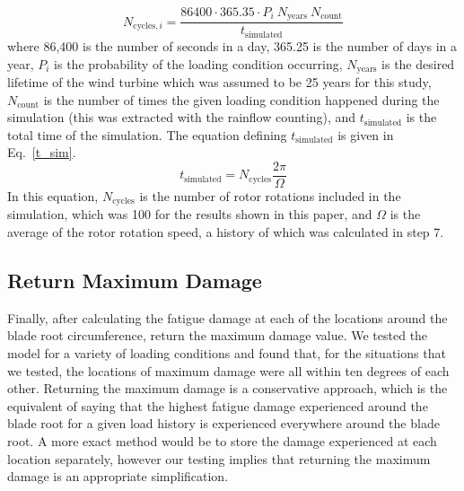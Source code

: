 \documentclass[11pt,letterpaper]{article}
\begin{document}
% 
\begin{equation}
    N_{\text{cycles},i} = \frac{86400 \cdot 365.35 \cdot P_i ~ N_{\text{years}}~ N_{\text{count}}}{t_{\text{simulated}}}
    \label{ncycles}
\end{equation}
% 
where 86,400 is the number of seconds in a day, 365.25 is the number of days in a year, $P_i$ is the probability of the loading condition occurring, $N_{\text{years}}$ is the desired lifetime of the wind turbine which was assumed to be 25 years for this study, $N_{\text{count}}$ is the number of times the given loading condition happened during the simulation (this was extracted with the rainflow counting), and $t_{\text{simulated}}$ is the total time of the simulation. The equation defining $t_{\text{simulated}}$ is given in Eq.~\ref{t_sim}.
% 
\begin{equation}
    t_{\text{simulated}} = N_{\text{cycles}} \frac{2\pi}{\Omega}
    \label{t_sim}
\end{equation}
% 
In this equation, $N_{\text{cycles}}$ is the number of rotor rotations included in the simulation, which was 100 for the results shown in this paper, and $\Omega$ is the average of the rotor rotation speed, a history of which was calculated in step 7. 
                


\subsection{Return Maximum Damage}

Finally, after calculating the fatigue damage at each of the locations around the blade root circumference, return the maximum damage value. 
We tested the model for a variety of loading conditions and found that, for the situations that we tested, the locations of maximum damage were all within ten degrees of each other.
Returning the maximum damage is a conservative approach, which is the equivalent of saying that the highest fatigue damage experienced around the blade root for a given load history is experienced everywhere around the blade root. 
A more exact method would be to store the damage experienced at each location separately, however our testing implies that returning the maximum damage is an appropriate simplification.
\end{document}
